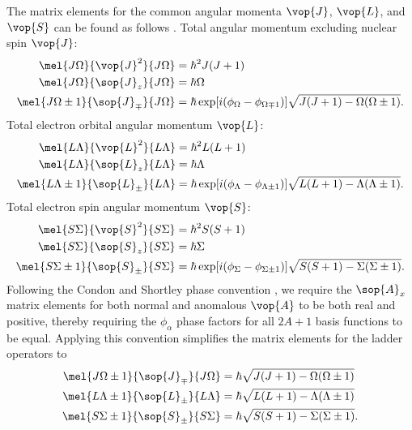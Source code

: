 The matrix elements for the common angular momenta $\vop{J}$, $\vop{L}$, and $\vop{S}$ can be found as follows \cite[8]{hougenCalculationRotationalEnergy1970}.
Total angular momentum excluding nuclear spin $\vop{J}$:
\begin{align*}
    \mel{J\Omega}{\vop{J}^2}{J\Omega}         & = \hbar^2J(J + 1)                                                                        \\
    \mel{J\Omega}{\sop{J}_z}{J\Omega}         & = \hbar\Omega                                                                            \\
    \mel{J\Omega \pm 1}{\sop{J}_\mp}{J\Omega} & = \hbar\exp[i(\phi_\Omega - \phi_{\Omega \mp 1})]\sqrt{J(J + 1) - \Omega(\Omega \pm 1)}.
\end{align*}
Total electron orbital angular momentum $\vop{L}$:
\begin{align*}
    \mel{L\Lambda}{\vop{L}^2}{L\Lambda}         & = \hbar^2L(L + 1)                                                                            \\
    \mel{L\Lambda}{\sop{L}_z}{L\Lambda}         & = \hbar\Lambda                                                                               \\
    \mel{L\Lambda \pm 1}{\sop{L}_\pm}{L\Lambda} & = \hbar\exp[i(\phi_\Lambda - \phi_{\Lambda \pm 1})]\sqrt{L(L + 1) - \Lambda(\Lambda \pm 1)}.
\end{align*}
Total electron spin angular momentum $\vop{S}$:
\begin{align*}
    \mel{S\Sigma}{\vop{S}^2}{S\Sigma}         & = \hbar^2S(S + 1)                                                                        \\
    \mel{S\Sigma}{\sop{S}_z}{S\Sigma}         & = \hbar\Sigma                                                                            \\
    \mel{S\Sigma \pm 1}{\sop{S}_\pm}{S\Sigma} & = \hbar\exp[i(\phi_\Sigma - \phi_{\Sigma \pm 1})]\sqrt{S(S + 1) - \Sigma(\Sigma \pm 1)}.
\end{align*}
Following the Condon and Shortley phase convention \cite[48]{condonTheoryAtomicSpectra1935}, we require the $\sop{A}_x$ matrix elements for both normal and anomalous $\vop{A}$ to be both real and positive, thereby requiring the $\phi_\alpha$ phase factors for all $2A + 1$ basis functions to be equal.
Applying this convention simplifies the matrix elements for the ladder operators to
\begin{align*}
    \mel{J\Omega \pm 1}{\sop{J}_\mp}{J\Omega}   & = \hbar\sqrt{J(J + 1) - \Omega(\Omega \pm 1)}   \\
    \mel{L\Lambda \pm 1}{\sop{L}_\pm}{L\Lambda} & = \hbar\sqrt{L(L + 1) - \Lambda(\Lambda \pm 1)} \\
    \mel{S\Sigma \pm 1}{\sop{S}_\pm}{S\Sigma}   & = \hbar\sqrt{S(S + 1) - \Sigma(\Sigma \pm 1)}.
\end{align*}

